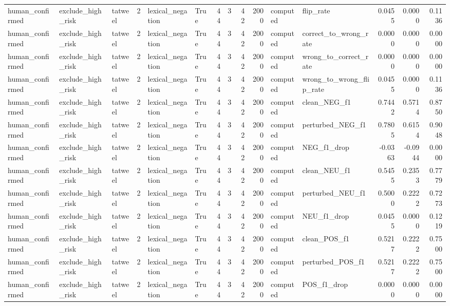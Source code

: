 \begin{tabular}{lllrllrrrrllrrr}
human_confirmed & exclude_high_risk & tatweel & 2 & lexical_negation & True & 44 & 3 & 42 & 2000 & computed & flip_rate & 0.0455 & 0.0000 & 0.1136 \\
human_confirmed & exclude_high_risk & tatweel & 2 & lexical_negation & True & 44 & 3 & 42 & 2000 & computed & correct_to_wrong_rate & 0.0000 & 0.0000 & 0.0000 \\
human_confirmed & exclude_high_risk & tatweel & 2 & lexical_negation & True & 44 & 3 & 42 & 2000 & computed & wrong_to_correct_rate & 0.0000 & 0.0000 & 0.0000 \\
human_confirmed & exclude_high_risk & tatweel & 2 & lexical_negation & True & 44 & 3 & 42 & 2000 & computed & wrong_to_wrong_flip_rate & 0.0455 & 0.0000 & 0.1136 \\
human_confirmed & exclude_high_risk & tatweel & 2 & lexical_negation & True & 44 & 3 & 42 & 2000 & computed & clean_NEG_f1 & 0.7442 & 0.5714 & 0.8750 \\
human_confirmed & exclude_high_risk & tatweel & 2 & lexical_negation & True & 44 & 3 & 42 & 2000 & computed & perturbed_NEG_f1 & 0.7805 & 0.6154 & 0.9048 \\
human_confirmed & exclude_high_risk & tatweel & 2 & lexical_negation & True & 44 & 3 & 42 & 2000 & computed & NEG_f1_drop & -0.0363 & -0.0944 & 0.0000 \\
human_confirmed & exclude_high_risk & tatweel & 2 & lexical_negation & True & 44 & 3 & 42 & 2000 & computed & clean_NEU_f1 & 0.5455 & 0.2353 & 0.7779 \\
human_confirmed & exclude_high_risk & tatweel & 2 & lexical_negation & True & 44 & 3 & 42 & 2000 & computed & perturbed_NEU_f1 & 0.5000 & 0.2222 & 0.7273 \\
human_confirmed & exclude_high_risk & tatweel & 2 & lexical_negation & True & 44 & 3 & 42 & 2000 & computed & NEU_f1_drop & 0.0455 & 0.0000 & 0.1219 \\
human_confirmed & exclude_high_risk & tatweel & 2 & lexical_negation & True & 44 & 3 & 42 & 2000 & computed & clean_POS_f1 & 0.5217 & 0.2222 & 0.7500 \\
human_confirmed & exclude_high_risk & tatweel & 2 & lexical_negation & True & 44 & 3 & 42 & 2000 & computed & perturbed_POS_f1 & 0.5217 & 0.2222 & 0.7500 \\
human_confirmed & exclude_high_risk & tatweel & 2 & lexical_negation & True & 44 & 3 & 42 & 2000 & computed & POS_f1_drop & 0.0000 & 0.0000 & 0.0000 \\
\bottomrule
\end{tabular}

